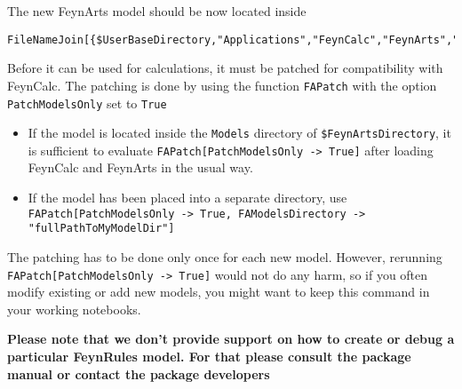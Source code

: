 \documentclass[../FeynCalcManual.tex]{subfiles}
\begin{document}
The new FeynArts model should be now located inside

\begin{verbatim}
FileNameJoin[{$UserBaseDirectory,"Applications","FeynCalc","FeynArts","Models"}]
\end{verbatim}

Before it can be used for calculations, it must be patched for
compatibility with FeynCalc. The patching is done by using the function
\texttt{FAPatch} with the option \texttt{PatchModelsOnly} set to
\texttt{True}

\begin{itemize}
\tightlist
\item
  If the model is located inside the \texttt{Models} directory of
  \texttt{\$FeynArtsDirectory}, it is sufficient to evaluate
  \texttt{FAPatch[\allowbreak{}PatchModelsOnly -> True]} after loading
  FeynCalc and FeynArts in the usual way.
\item
  If the model has been placed into a separate directory, use
  \texttt{FAPatch[\allowbreak{}PatchModelsOnly -> True,\ \allowbreak{}FAModelsDirectory -> "fullPathToMyModelDir"]}
\end{itemize}

The patching has to be done only once for each new model. However,
rerunning \texttt{FAPatch[\allowbreak{}PatchModelsOnly -> True]} would
not do any harm, so if you often modify existing or add new models, you
might want to keep this command in your working notebooks.

\textbf{Please note that we don't provide support on how to create or
debug a particular FeynRules model. For that please consult the package
manual or contact the package developers }
\end{document}
